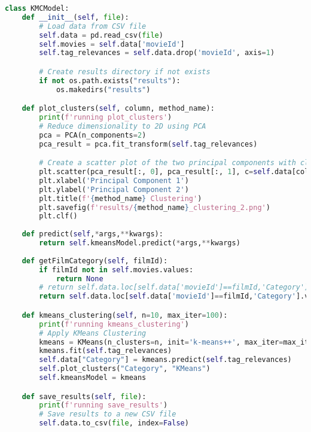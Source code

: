 \documentclass[lettersize,journal]{IEEEtran}
\begin{document}
\begin{lstlisting}[language=Python]
class KMCModel:
    def __init__(self, file):
        # Load data from CSV file
        self.data = pd.read_csv(file)
        self.movies = self.data['movieId']
        self.tag_relevances = self.data.drop('movieId', axis=1)

        # Create results directory if not exists
        if not os.path.exists("results"):
            os.makedirs("results")

    def plot_clusters(self, column, method_name):
        print(f'running plot_clusters')
        # Reduce dimensionality to 2D using PCA
        pca = PCA(n_components=2)
        pca_result = pca.fit_transform(self.tag_relevances)

        # Create a scatter plot of the two principal components with cluster labels as color
        plt.scatter(pca_result[:, 0], pca_result[:, 1], c=self.data[column], cmap='viridis')
        plt.xlabel('Principal Component 1')
        plt.ylabel('Principal Component 2')
        plt.title(f'{method_name} Clustering')
        plt.savefig(f'results/{method_name}_clustering_2.png')
        plt.clf()
        
    def predict(self,*args,**kwargs):
        return self.kmeansModel.predict(*args,**kwargs)
    
    def getFilmCategory(self, filmId):
        if filmId not in self.movies.values:
            return None
        # return self.data.loc[self.data['movieId']==filmId,'Category'].values[0]
        return self.data.loc[self.data['movieId']==filmId,'Category'].values[0]

    def kmeans_clustering(self, n=10, max_iter=100):
        print(f'running kmeans_clustering')
        # Apply KMeans Clustering
        kmeans = KMeans(n_clusters=n, init='k-means++', max_iter=max_iter, n_init=1)
        kmeans.fit(self.tag_relevances)
        self.data["Category"] = kmeans.predict(self.tag_relevances)
        self.plot_clusters("Category", "KMeans")
        self.kmeansModel = kmeans

    def save_results(self, file):
        print(f'running save_results')
        # Save results to a new CSV file
        self.data.to_csv(file, index=False)

\end{lstlisting}
\end{document}
